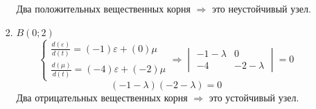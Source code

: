 \documentclass[11pt]{article}
\begin{document}
\begin{enumerate}
\begin{enumerate}
\begin{enumerate}
		Два положительных вещественных корня $\Rightarrow$ это неустойчивый узел.
				\item $B(0;2)$
				$$\begin{cases}
					\frac{d(\varepsilon)}{d(t)} = (-1)\varepsilon+(0)\mu\\
					\frac{d(\mu)}{d(t)} = (-4)\varepsilon+(-2)\mu 
				\end{cases}\Rightarrow \begin{vmatrix}
				-1-\lambda & 0\\
				-4 & -2 - \lambda
			\end{vmatrix} = 0$$
				$$ (-1-\lambda)(-2-\lambda) = 0$$
				Два отрицательных вещественных корня $\Rightarrow$ это устойчивый узел.
			\end{enumerate}

			
		\end{enumerate}
		\begin{figure}[htbp!]
			\centering
\end{figure}
\end{enumerate}
\end{document}
